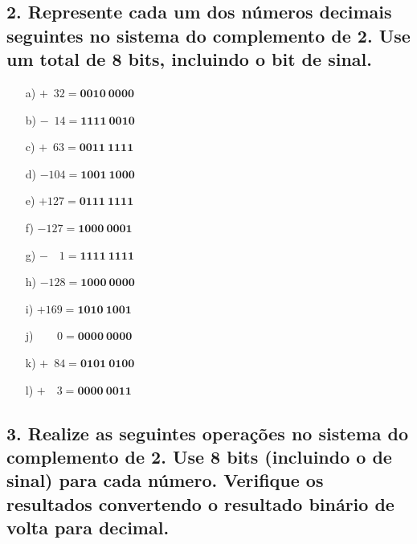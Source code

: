 \documentclass[a4paper, 12pt]{article}
\begin{document}
\subsection*{2. Represente cada um dos números decimais seguintes no sistema do complemento de 2. Use um total de 8 bits, incluindo o bit de sinal.}

\begin{enumerate}
    \item[a)] \(+  \phantom{1}32 = \mathbf{0010\ 0000}\)
    \item[b)] \(-  \phantom{1}14 = \mathbf{1111\ 0010}\)
    \item[c)] \(+  \phantom{1}63 = \mathbf{0011\ 1111}\)
    \item[d)] \(-            104 = \mathbf{1001\ 1000}\)
    \item[e)] \(+            127 = \mathbf{0111\ 1111}\)
    \item[f)] \(-            127 = \mathbf{1000\ 0001}\)
    \item[g)] \(-  \phantom{12}1 = \mathbf{1111\ 1111}\)
    \item[h)] \(-            128 = \mathbf{1000\ 0000}\)
    \item[i)] \(+            169 = \mathbf{1010\ 1001}\)
    \item[j)] \( \phantom{- 12}0 = \mathbf{0000\ 0000}\)
    \item[k)] \(+  \phantom{1}84 = \mathbf{0101\ 0100}\)
    \item[l)] \(+  \phantom{12}3 = \mathbf{0000\ 0011}\)
\end{enumerate}

\subsection*{3. Realize as seguintes operações no sistema do complemento de 2. Use 8 bits (incluindo o de sinal) para cada número. Verifique os resultados convertendo o resultado binário de volta para decimal.}
\end{document}
